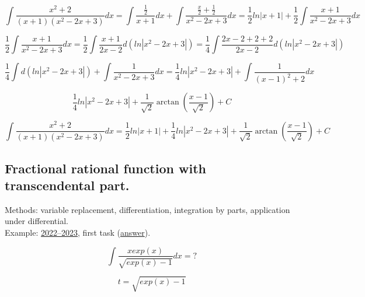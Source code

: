 \documentclass{article}
\begin{document}
\begin{equation*}
    \int \frac{x^2+2}{(x+1)(x^2-2x+3)}dx = \int \frac{\frac{1}{2}}{x+1}dx + \int \frac{\frac{x}{2}+\frac{1}{2}}{x^2-2x+3}dx = \frac{1}{2}ln|x+1| + \frac{1}{2} \int \frac{x+1}{x^2-2x+3}dx
\end{equation*}

\begin{equation*}
    \frac{1}{2} \int \frac{x+1}{x^2-2x+3}dx = \frac{1}{2} \int \frac{x+1}{2x-2}d(ln|x^2-2x+3|) = \frac{1}{4} \int \frac{2x-2+2+2}{2x-2}d(ln|x^2-2x+3|)
\end{equation*}

\begin{equation*}
    \frac{1}{4} \int d(ln|x^2-2x+3|) + \int \frac{1}{x^2-2x+3}dx = \frac{1}{4} ln|x^2-2x+3| + \int \frac{1}{(x-1)^2+2}dx
\end{equation*}

\begin{equation*}
    \frac{1}{4} ln|x^2-2x+3| + \frac{1}{\sqrt{2}} \arctan (\frac{x-1}{\sqrt{2}}) + C
\end{equation*}

\begin{equation}
    \int \frac{x^2+2}{(x+1)(x^2-2x+3)}dx = \frac{1}{2}ln|x+1| + \frac{1}{4} ln|x^2-2x+3| + \frac{1}{\sqrt{2}} \arctan (\frac{x-1}{\sqrt{2}}) + C
\end{equation}

\subsection{Fractional rational function with transcendental part.}

Methods: variable replacement, differentiation, integration by parts, application under differential. \\
Example: \href{https://old.mipt.ru/education/chair/mathematics/exams/exams/2022-23/%D0%9C%D0%90%D0%98%D0%B8%D0%A0_%D0%92_23.pdf}{2022–2023}, first task (\href{https://old.mipt.ru/education/chair/mathematics/exams/exams/2022-23/%D0%9C%D0%90%D0%98%D0%B8%D0%A0_%D0%92_23%D0%BE%D1%82%D0%B2%D0%B5%D1%82%D1%8B.pdf}{answer}).

\begin{equation}
    \int \frac{x exp(x)}{\sqrt{exp(x)-1}}dx = ?
\end{equation}

\begin{equation}
    t = \sqrt{exp(x)-1}
\end{equation}
\end{document}
